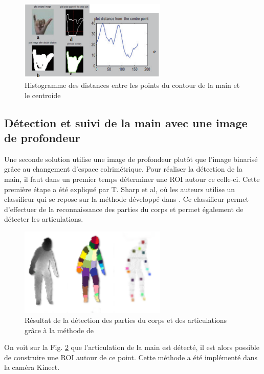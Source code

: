 \begin{figure}[!h]
\center
\includegraphics[width=7cm]{images/handHisto.png}
\caption{Histogramme des distances entre les points du contour de la main et le centroide}
\label{fig:handHisto}
\end{figure}


\subsection{Détection et suivi de la main avec une image de profondeur}
Une seconde solution utilise une image de profondeur plutôt que l'image binarisé grâce au changement d'espace colrimétrique.
Pour réaliser la détection de la main, il faut dans un premier temps déterminer une ROI
autour ce celle-ci. Cette première étape a été expliqué par T. Sharp et al\cite{export:238453}, où les auteurs utilise un classifieur
qui se repose sur la méthode développé dans \cite{export:145347}. Ce classifieur permet d'effectuer de la reconnaissance
des parties du corps et permet également de détecter les articulations.

\begin{figure}[!h]
 \begin{center}
  \includegraphics[width=7cm]{images/bodyrecognition.png}
  \caption{Résultat de la détection des parties du corps et des articulations grâce à la méthode de \cite{export:145347}}
  \label{fig:bodyrecognition}
 \end{center}
\end{figure}

\newpage

On voit sur la Fig. \ref{fig:bodyrecognition} que l'articulation de la main est détecté, il est alors possible de construire
une ROI autour de ce point. Cette méthode a été implémenté dans la caméra Kinect.\\

